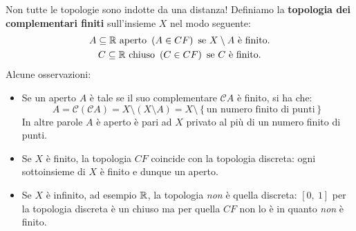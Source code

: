 \begin{attention}
	Non tutte le topologie sono indotte da una distanza! Definiamo la \textbf{topologia dei complementari finiti} sull'insieme $X$ nel modo seguente:
	\begin{gather*}
		A\subseteq \mathbb{R} \text{ aperto } \left(A\in CF\right) \text{ se }  X\setminus A \text{ è finito.}\\
		C\subseteq \mathbb{R} \text{ chiuso } \left(C\in CF\right) \text{ se }  C \text{ è finito.}
	\end{gather*}
	Alcune osservazioni:
	\begin{itemize}
		\item Se un aperto $A$ è tale se il suo complementare $\mathcal{C}A$ è finito, si ha che:
		\begin{equation}
			A=\mathcal{C}\left(\mathcal{C}A\right)=X\setminus\left(X\setminus A\right)=X\setminus\left\{\text{un numero finito di punti}\right\}
		\end{equation}
		In altre parole $A$ è aperto è pari ad $X$ privato al più di un numero finito di punti.
		\item Se $X$ è finito, la topologia $CF$ coincide con la topologia discreta: ogni sottoinsieme di $X$ è finito e dunque un aperto.
		\item Se $X$ è infinito, ad esempio $\mathbb{R}$, la topologia \textit{non} è quella discreta: $[0,\ 1]$ per la topologia discreta è un chiuso ma per quella $CF$ non lo è in quanto \textit{non} è finito.
	\end{itemize}
\end{attention}
